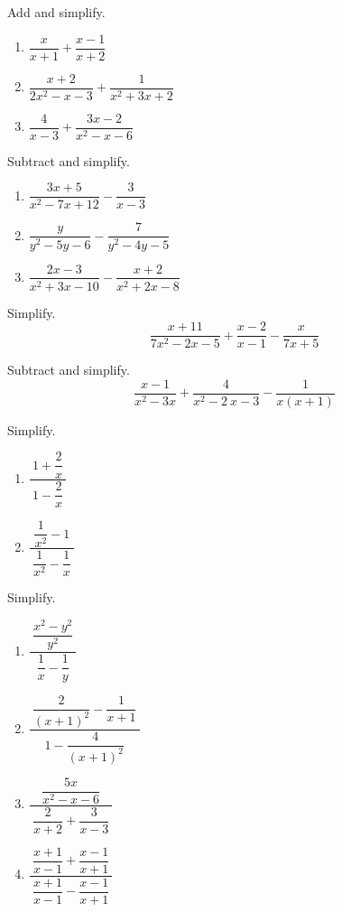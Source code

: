 \begin{exercise}
  Add and simplify.
  
  \begin{enumerate}
  \item
    \(\dfrac{x}{x+1}+\dfrac{x-1}{x+2}\)
  \item
    \(\dfrac{x+2}{2x^2-x-3}+\dfrac{1}{x^2+3x+2}\)
  \item
    \(\dfrac{4}{x-3}+\dfrac{3x-2}{x^2-x-6}\)
  \end{enumerate}
\end{exercise}

\begin{exercise}
  Subtract and simplify.
  
  \begin{enumerate}
  \item
    \(\dfrac{3x+5}{x^2-7x+12}-\dfrac{3}{x-3}\)
  \item
    \(\dfrac{y}{y^2-5y-6}-\dfrac{7}{y^2-4y-5}\)
  \item
    \(\dfrac{2x-3}{x^2+3x-10}-\dfrac{x+2}{x^2+2x-8}\)
  \end{enumerate}
\end{exercise}

\begin{exercise}
  Simplify. \[
  \dfrac{x+11}{7x^2-2x-5}+\dfrac{x-2}{x-1}-\dfrac{x}{7x+5}
  \]
\end{exercise}
\vspace*{4\baselineskip}

\begin{exercise}
  Subtract and simplify. \[
  \dfrac{x-1}{x^2-3x}+\dfrac{4}{x^2-2\:x-3}-\dfrac{1}{x\left(x+1\right)}
  \]
\end{exercise}
\vspace*{4\baselineskip}

\begin{exercise}
  Simplify.
  
  \begin{enumerate}
  \item
    \(\dfrac{~1+\dfrac{2}{x}~}{~1-\dfrac{2}{x}~}\)
  \item
    \(\dfrac{~\dfrac{1}{x^2}-1~}{~\dfrac{1}{x^2}-\dfrac{1}{x}~}\)
  \end{enumerate}
\end{exercise}

\begin{exercise}
  Simplify.
  
  \begin{enumerate}
  \item
    \(\dfrac{~\dfrac{x^2-y^2}{y^2}~}{~\dfrac1x-\dfrac{1}{y}~}\)
  \item
    \(\dfrac{~\dfrac{2}{(x+1)^2}-\dfrac{1}{x+1}~}{~1-\dfrac{4}{(x+1)^2}~}\)
    \item
      \(\dfrac{~\dfrac{5x}{x^2-x-6}~}{~\dfrac2{x+2}+\dfrac{3}{x-3}~}\)
    \item
      \(\dfrac{~\dfrac{x+1}{x-1}+\dfrac{x-1}{x+1}~}{~\dfrac{x+1}{x-1}-\dfrac{x-1}{x+1}~}\)
  \end{enumerate}
\end{exercise}

